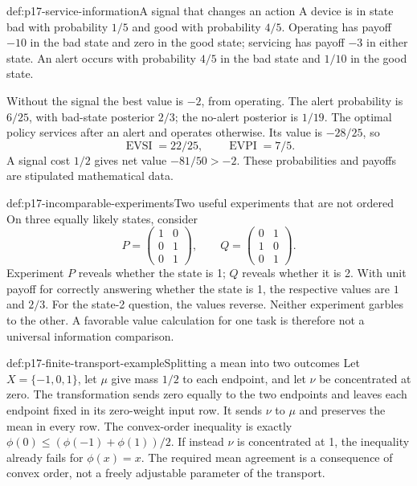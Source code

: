 \begin{hbexample}{def:p17-service-information}{A signal that changes an action}
A device is in state bad with probability \(1/5\) and good with
probability \(4/5\). Operating has payoff \(-10\) in the bad state and
zero in the good state; servicing has payoff \(-3\) in either state.
An alert occurs with probability \(4/5\) in the bad state and \(1/10\)
in the good state.

Without the signal the best value is \(-2\), from operating. The alert
probability is \(6/25\), with bad-state posterior \(2/3\); the no-alert
posterior is \(1/19\). The optimal policy services after an alert and
operates otherwise. Its value is \(-28/25\), so
\[
               \operatorname{EVSI}=22/25,\qquad
               \operatorname{EVPI}=7/5.
\]
A signal cost \(1/2\) gives net value \(-81/50>-2\).
These probabilities and payoffs are stipulated mathematical data.
\end{hbexample}

\begin{hbexample}{def:p17-incomparable-experiments}{Two useful experiments that are not ordered}
On three equally likely states, consider
\[
 P=\begin{pmatrix}1&0\\0&1\\0&1\end{pmatrix},
 \qquad
 Q=\begin{pmatrix}0&1\\1&0\\0&1\end{pmatrix}.
\]
Experiment \(P\) reveals whether the state is 1; \(Q\) reveals whether
it is 2. With unit payoff for correctly answering whether the state is 1,
the respective values are \(1\) and \(2/3\). For the state-2 question,
the values reverse. Neither experiment garbles to the other.
A favorable value calculation for one task is therefore not a universal
information comparison.
\end{hbexample}

\begin{hbexample}{def:p17-finite-transport-example}{Splitting a mean into two outcomes}
Let \(X=\{-1,0,1\}\), let \(\mu\) give mass \(1/2\) to each endpoint,
and let \(\nu\) be concentrated at zero. The transformation sends zero
equally to the two endpoints and leaves each endpoint fixed in its
zero-weight input row. It sends \(\nu\) to \(\mu\) and preserves the mean
in every row. The convex-order inequality is exactly
\(\phi(0)\leq(\phi(-1)+\phi(1))/2\).
If instead \(\nu\) is concentrated at 1, the inequality already fails
for \(\phi(x)=x\). The required mean agreement is a consequence of convex
order, not a freely adjustable parameter of the transport.
\end{hbexample}

